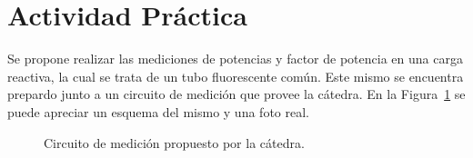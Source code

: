  \section{Actividad Práctica}
    Se propone realizar las mediciones de potencias y factor de potencia en una carga reactiva, la cual 
    se trata de un tubo fluorescente común. Este mismo se encuentra prepardo junto a un circuito de medición
    que provee la cátedra. En la Figura~\ref{fig:CircuitoMedicion} se puede apreciar un esquema del mismo y una foto real.

    \begin{figure}[H]
      \centering
      \caption{Circuito de medición propuesto por la cátedra.}
      \label{fig:CircuitoMedicion}
    \end{figure}
    
    
    

